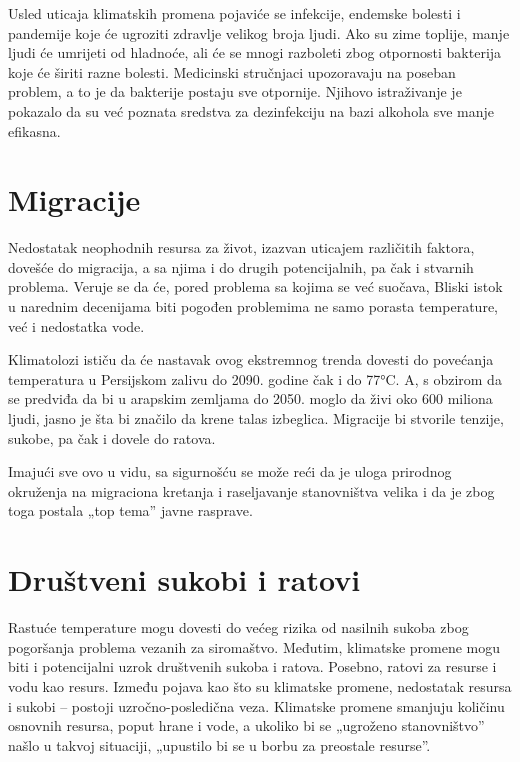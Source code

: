 \documentclass[a4paper]{article}
\begin{document}
Usled uticaja klimatskih promena pojaviće se infekcije, endemske bolesti i pandemije koje će ugroziti zdravlje velikog broja ljudi. Ako su zime toplije, manje ljudi će umrijeti od hladnoće, ali će se
mnogi razboleti zbog otpornosti bakterija koje će širiti razne bolesti.
Medicinski stručnjaci upozoravaju na poseban problem, a to je da bakterije postaju sve otpornije.
Njihovo istraživanje je pokazalo da su već poznata sredstva za dezinfekciju na bazi alkohola sve manje efikasna.

\section{Migracije}
\label{sec:migracije}

Nedostatak neophodnih resursa za život, izazvan uticajem različitih faktora, dovešće do migracija, a sa njima i do drugih potencijalnih, pa čak i stvarnih problema. 
Veruje se da će, pored problema sa kojima se već suočava, Bliski istok u narednim decenijama biti pogođen problemima ne samo porasta temperature, već i nedostatka vode.

Klimatolozi ističu da će nastavak ovog ekstremnog trenda dovesti do povećanja temperatura u Persijskom zalivu do 2090. godine čak i do 77°C. A, s obzirom da se predviđa da bi u arapskim zemljama do 2050. moglo da živi oko 600 miliona ljudi, jasno je šta bi značilo da krene talas izbeglica.
Migracije bi stvorile tenzije, sukobe, pa čak i dovele do ratova. 

Imajući sve ovo u vidu, sa sigurnošću se može reći da je uloga prirodnog okruženja na migraciona
kretanja i raseljavanje stanovništva velika i da je zbog toga postala „top tema” javne rasprave.



\section{Društveni sukobi i ratovi}
\label{sec:društveni_sukobi_i_ratovi}

Rastuće temperature mogu dovesti do većeg rizika od nasilnih sukoba zbog pogoršanja problema vezanih za siromaštvo. Međutim, klimatske promene mogu biti i potencijalni uzrok društvenih sukoba i ratova.
Posebno, ratovi za resurse i vodu kao resurs. Između pojava kao što su klimatske promene, nedostatak resursa i sukobi – postoji uzročno-posledična veza.
Klimatske promene smanjuju količinu osnovnih resursa, poput hrane i vode, a ukoliko bi se „ugroženo stanovništvo” našlo u takvoj situaciji, „upustilo bi se u borbu za preostale resurse”.
\end{document}
